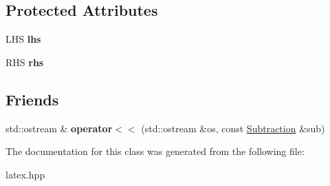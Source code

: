 \subsection*{Protected Attributes}
\begin{DoxyCompactItemize}
\item 
\hypertarget{classlatex_1_1math_1_1Subtraction_a67b20ecf5ef3502267c3e6ff97913e06}{L\-H\-S {\bfseries lhs}}\label{classlatex_1_1math_1_1Subtraction_a67b20ecf5ef3502267c3e6ff97913e06}

\item 
\hypertarget{classlatex_1_1math_1_1Subtraction_a26db1c6713c7a71f94514f2650d486cc}{R\-H\-S {\bfseries rhs}}\label{classlatex_1_1math_1_1Subtraction_a26db1c6713c7a71f94514f2650d486cc}

\end{DoxyCompactItemize}
\subsection*{Friends}
\begin{DoxyCompactItemize}
\item 
\hypertarget{classlatex_1_1math_1_1Subtraction_ae77c371395f130ab14f3c769df6494ee}{std\-::ostream \& {\bfseries operator$<$$<$} (std\-::ostream \&os, const \hyperlink{classlatex_1_1math_1_1Subtraction}{Subtraction} \&sub)}\label{classlatex_1_1math_1_1Subtraction_ae77c371395f130ab14f3c769df6494ee}

\end{DoxyCompactItemize}


The documentation for this class was generated from the following file\-:\begin{DoxyCompactItemize}
\item 
latex.\-hpp\end{DoxyCompactItemize}
